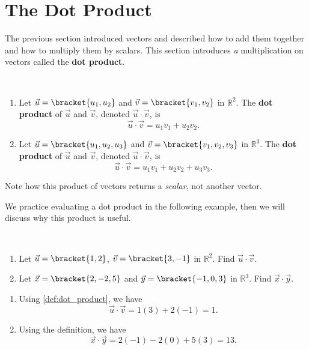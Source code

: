 \section{The Dot Product}\label{sec:dot_product}

The previous section introduced vectors and described how to add them together and how to multiply them by scalars. This section introduces \emph{a} multiplication on vectors called the \textbf{dot product}.

\begin{definition}\label{def:dot_product}%
\mbox{}\\[-2\baselineskip]\parbox[t]{\linewidth}{\begin{enumerate}
	\item Let $\vec u =\bracket{u_1,u_2}$ and $\vec v = \bracket{v_1,v_2}$  in $\mathbb{R}^2$. The \textbf{dot product} of $\vec u$ and $\vec v$, denoted $\vec u\cdot\vec v$, is 
	\[\vec u\cdot\vec v = u_1v_1+u_2v_2.\]
	\item Let $\vec u = \bracket{u_1,u_2,u_3}$ and $\vec v = \bracket{v_1,v_2,v_3}$  in $\mathbb{R}^3$. The \textbf{dot product} of $\vec u$ and $\vec v$, denoted $\vec u\cdot \vec v$, is 
	\[\vec u\cdot\vec v = u_1v_1+u_2v_2+u_3v_3.\]
\end{enumerate}}
\end{definition}

Note how this product of vectors returns a \emph{scalar}, not another vector.

We practice evaluating a dot product in the following example, then we will discuss why this product is useful.

\begin{example}\label{ex_dotp1}%
\mbox{}\\[-2\baselineskip]\parbox[t]{\linewidth}{%
\begin{enumerate}
	\item Let $\vec u=\bracket{1,2}$, $\vec v=\bracket{3,-1}$ in $\mathbb{R}^2$. Find $\vec u\cdot\vec v$.
	\item Let $\vec x = \bracket{2,-2,5}$ and $\vec y = \bracket{-1, 0, 3}$ in $\mathbb{R}^3$. Find $\vec x\cdot\vec y$.
\end{enumerate}}\vspace{0pt}
\solution
\begin{enumerate}
	\item Using \autoref{def:dot_product}, we have
	\[\vec u\cdot\vec v = 1(3)+2(-1) = 1.\]
	\item	Using the definition, we have
	\[\vec x\cdot\vec y = 2(-1)  -2(0) + 5(3) = 13.\]
\end{enumerate}
\end{example}

